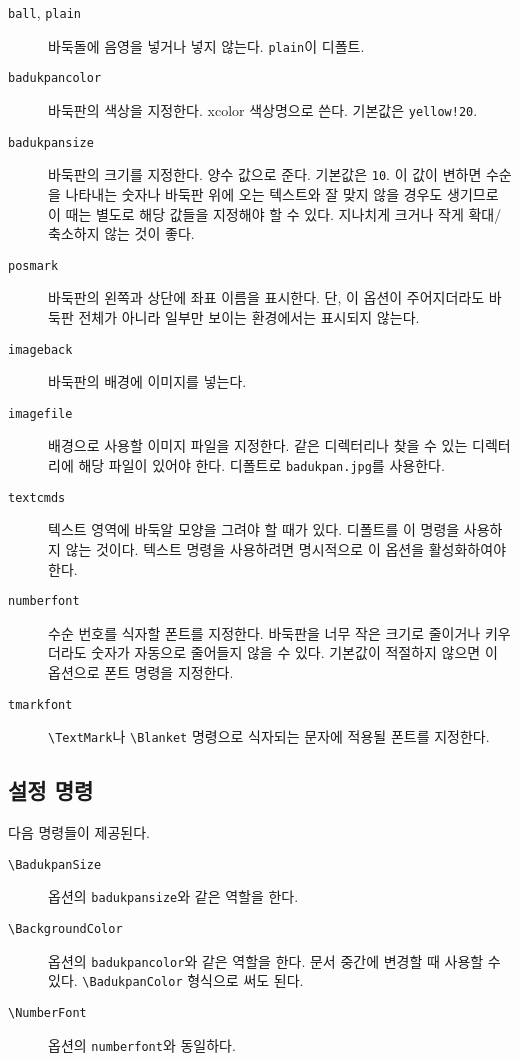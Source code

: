\documentclass[figtabcapt,a4paper]{oblivoir}
\def\bs{\textbackslash}
\begin{document}
\begin{description}
\item [\texttt{ball}, \texttt{plain}] 바둑돌에 음영을 넣거나 넣지 않는다. \texttt{plain}이 디폴트.
\item [\texttt{badukpancolor}] 바둑판의 색상을 지정한다. \textsf{xcolor} 색상명으로 쓴다. 기본값은 \texttt{yellow!20}.
\item [\texttt{badukpansize}] 바둑판의 크기를 지정한다. 양수 값으로 준다. 기본값은 \texttt{10}. 이 값이 변하면 수순을 나타내는 숫자나 바둑판 위에 오는 텍스트와 잘 맞지 않을 경우도 생기므로 이 때는 별도로 해당 값들을 지정해야 할 수 있다. 지나치게 크거나 작게 확대/축소하지 않는 것이 좋다.
\item [\texttt{posmark}] 바둑판의 왼쪽과 상단에 좌표 이름을 표시한다. 단, 이 옵션이 주어지더라도 바둑판 전체가 아니라 일부만 보이는 환경에서는 표시되지 않는다.
\item [\texttt{imageback}] 바둑판의 배경에 이미지를 넣는다.
\item [\texttt{imagefile}] 배경으로 사용할 이미지 파일을 지정한다. 같은 디렉터리나 찾을 수 있는 디렉터리에 해당 파일이 있어야 한다. 디폴트로 \texttt{badukpan.jpg}를 사용한다.
\item [\texttt{textcmds}] 텍스트 영역에 바둑알 모양을 그려야 할 때가 있다. 디폴트를 이 명령을 사용하지 않는 것이다. 텍스트 명령을 사용하려면 명시적으로 이 옵션을 활성화하여야 한다.
\item [\texttt{numberfont}] 수순 번호를 식자할 폰트를 지정한다. 바둑판을 너무 작은 크기로 줄이거나 키우더라도 숫자가 자동으로 줄어들지 않을 수 있다. 기본값이 적절하지 않으면 이 옵션으로 폰트 명령을 지정한다.
\item [\texttt{tmarkfont}] \verb|\TextMark|나 \verb|\Blanket| 명령으로 식자되는 문자에 적용될 폰트를 지정한다.
\end{description}

\subsection{설정 명령}
다음 명령들이 제공된다.

\begin{description}
\item [\texttt{\bs BadukpanSize}] 옵션의 \verb|badukpansize|와 같은 역할을 한다.
\item [\texttt{\bs BackgroundColor}] 옵션의 \verb|badukpancolor|와 같은 역할을 한다. 문서 중간에 변경할 때 사용할 수 있다. \texttt{\bs BadukpanColor} 형식으로 써도 된다.
\item [\texttt{\bs NumberFont}] 옵션의 \verb|numberfont|와 동일하다.
\end{description}
\end{document}
